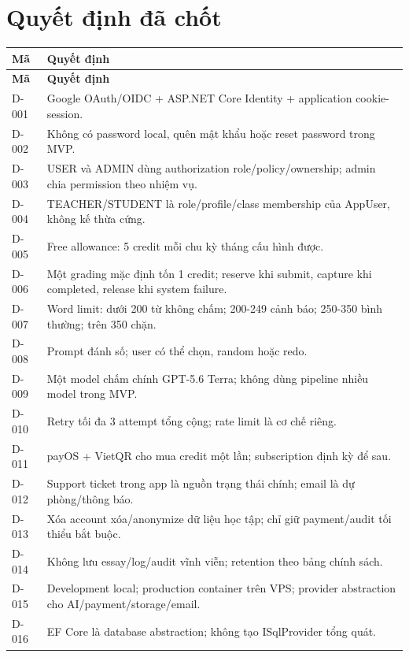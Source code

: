 \documentclass[11pt,a4paper]{article}
\begin{document}
\section{Quyết định đã chốt}
\small
\setlength{\tabcolsep}{4pt}
\renewcommand{\arraystretch}{1.18}
\begin{longtable}{|P{0.14\textwidth}|P{0.78\textwidth}|}
\hline
\textbf{Mã} & \textbf{Quyết định} \\ \hline
\endfirsthead
\hline
\textbf{Mã} & \textbf{Quyết định} \\ \hline
\endhead
D-001 & Google OAuth/\allowbreak{}OIDC + ASP.NET Core Identity + application cookie-session. \\ \hline
D-002 & Không có password local, quên mật khẩu hoặc reset password trong MVP. \\ \hline
D-003 & USER và ADMIN dùng authorization role/\allowbreak{}policy/\allowbreak{}ownership; admin chia permission theo nhiệm vụ. \\ \hline
D-004 & TEACHER/\allowbreak{}STUDENT là role/\allowbreak{}profile/\allowbreak{}class membership của AppUser, không kế thừa cứng. \\ \hline
D-005 & Free allowance: 5 credit mỗi chu kỳ tháng cấu hình được. \\ \hline
D-006 & Một grading mặc định tốn 1 credit; reserve khi submit, capture khi completed, release khi system failure. \\ \hline
D-007 & Word limit: dưới 200 từ không chấm; 200-249 cảnh báo; 250-350 bình thường; trên 350 chặn. \\ \hline
D-008 & Prompt đánh số; user có thể chọn, random hoặc redo. \\ \hline
D-009 & Một model chấm chính GPT-5.6 Terra; không dùng pipeline nhiều model trong MVP. \\ \hline
D-010 & Retry tối đa 3 attempt tổng cộng; rate limit là cơ chế riêng. \\ \hline
D-011 & payOS + VietQR cho mua credit một lần; subscription định kỳ để sau. \\ \hline
D-012 & Support ticket trong app là nguồn trạng thái chính; email là dự phòng/\allowbreak{}thông báo. \\ \hline
D-013 & Xóa account xóa/\allowbreak{}anonymize dữ liệu học tập; chỉ giữ payment/\allowbreak{}audit tối thiểu bắt buộc. \\ \hline
D-014 & Không lưu essay/\allowbreak{}log/\allowbreak{}audit vĩnh viễn; retention theo bảng chính sách. \\ \hline
D-015 & Development local; production container trên VPS; provider abstraction cho AI/\allowbreak{}payment/\allowbreak{}storage/\allowbreak{}email. \\ \hline
D-016 & EF Core là database abstraction; không tạo ISqlProvider tổng quát. \\ \hline
\end{longtable}
\normalsize
\end{document}
